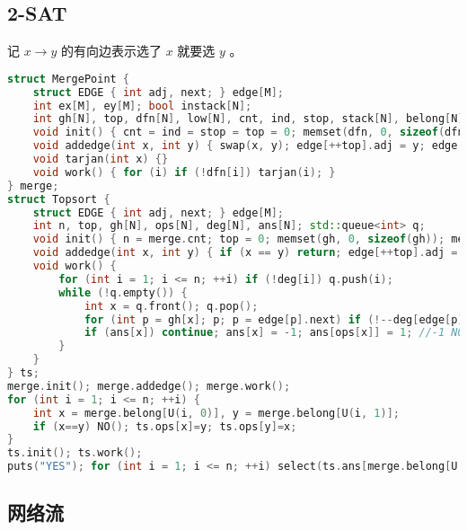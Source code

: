 \documentclass{article}
\begin{document}
\subsection{2-SAT}

记 $x \rightarrow y$ 的有向边表示选了 $x$ 就要选 $y$ 。

\begin{lstlisting}[language=C++]
struct MergePoint {
	struct EDGE { int adj, next; } edge[M];
	int ex[M], ey[M]; bool instack[N];
	int gh[N], top, dfn[N], low[N], cnt, ind, stop, stack[N], belong[N];
	void init() { cnt = ind = stop = top = 0; memset(dfn, 0, sizeof(dfn)); memset(instack, 0, sizeof(instack)); memset(gh, 0, sizeof(gh)); }
	void addedge(int x, int y) { swap(x, y); edge[++top].adj = y; edge[top].next = gh[x]; gh[x] = top; ex[top] = x; ey[top] = y; }
	void tarjan(int x) {}
	void work() { for (i) if (!dfn[i]) tarjan(i); }
} merge; 
struct Topsort {
	struct EDGE { int adj, next; } edge[M];
	int n, top, gh[N], ops[N], deg[N], ans[N]; std::queue<int> q;
	void init() { n = merge.cnt; top = 0; memset(gh, 0, sizeof(gh)); memset(deg, 0, sizeof(deg)); }
	void addedge(int x, int y) { if (x == y) return; edge[++top].adj = y; edge[top].next = gh[x]; gh[x] = top; ++deg[y]; }
	void work() {
		for (int i = 1; i <= n; ++i) if (!deg[i]) q.push(i);
		while (!q.empty()) {
			int x = q.front(); q.pop();
			for (int p = gh[x]; p; p = edge[p].next) if (!--deg[edge[p].adj]) q.push(edge[p].adj);
			if (ans[x]) continue; ans[x] = -1; ans[ops[x]] = 1; //-1 NO, 1 YES
		}
	}
} ts;
merge.init(); merge.addedge(); merge.work();
for (int i = 1; i <= n; ++i) {
	int x = merge.belong[U(i, 0)], y = merge.belong[U(i, 1)];
	if (x==y) NO(); ts.ops[x]=y; ts.ops[y]=x;
}
ts.init(); ts.work();
puts("YES"); for (int i = 1; i <= n; ++i) select(ts.ans[merge.belong[U(i,1)] == 1);
\end{lstlisting}

\subsection{网络流}
\end{document}
